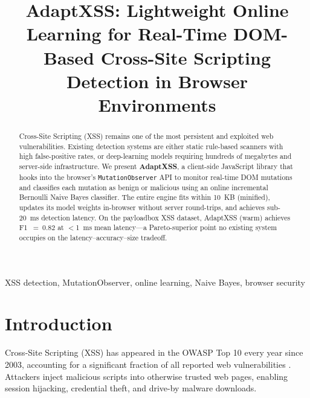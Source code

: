 \documentclass[conference]{IEEEtran}
\begin{document}
\title{AdaptXSS: Lightweight Online Learning for Real-Time DOM-Based Cross-Site Scripting Detection in Browser Environments}

\author{
}

\maketitle

\begin{abstract}
Cross-Site Scripting (XSS) remains one of the most persistent and exploited web vulnerabilities. Existing detection systems are either static rule-based scanners with high false-positive rates, or deep-learning models requiring hundreds of megabytes and server-side infrastructure. We present \textbf{AdaptXSS}, a client-side JavaScript library that hooks into the browser's \texttt{MutationObserver} API to monitor real-time DOM mutations and classifies each mutation as benign or malicious using an online incremental Bernoulli Naive Bayes classifier. The entire engine fits within 10~KB (minified), updates its model weights in-browser without server round-trips, and achieves sub-20~ms detection latency. On the payloadbox XSS dataset, AdaptXSS (warm) achieves F1~$=~0.82$ at $<$1~ms mean latency—a Pareto-superior point no existing system occupies on the latency–accuracy–size tradeoff.
\end{abstract}

\begin{IEEEkeywords}
XSS detection, MutationObserver, online learning, Naive Bayes, browser security
\end{IEEEkeywords}

\section{Introduction}

Cross-Site Scripting (XSS) has appeared in the OWASP Top 10 every year since 2003, accounting for a significant fraction of all reported web vulnerabilities \cite{owasp_zap}. Attackers inject malicious scripts into otherwise trusted web pages, enabling session hijacking, credential theft, and drive-by malware downloads.
\end{document}
